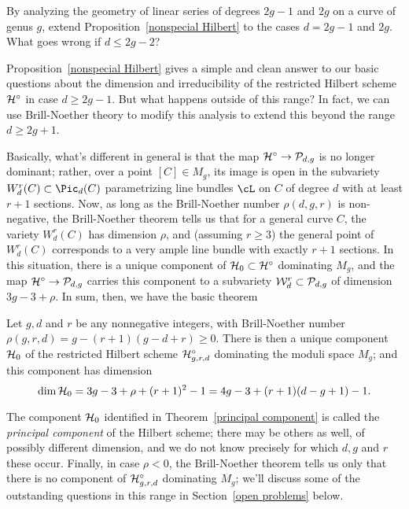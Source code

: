 \begin{exercise}
By analyzing the geometry of linear series of degrees $2g-1$ and $2g$ on a curve of genus $g$, extend Proposition~\ref{nonspecial Hilbert} to the cases $d = 2g-1$ and $2g$. What goes wrong if $d \leq 2g-2$?
\end{exercise}

Proposition~\ref{nonspecial Hilbert} gives a simple and clean answer to our basic questions about the dimension and irreducibility of the restricted Hilbert scheme $\cH^\circ$ in case $d \geq 2g-1$. But what happens outside of this range? In fact, we  can use Brill-Noether theory to modify this analysis to extend this beyond the range $d \geq 2g+1$.

Basically, what's different in general is that the map $\cH^\circ \to \cP_{d,g}$ is no longer dominant; rather, over a point $[C] \in M_g$, its image is open in the subvariety $W^r_d(C) \subset \Pic_d(C)$ parametrizing line bundles $\cL$ on $C$ of degree $d$ with at least $r+1$ sections. Now, as long as the Brill-Noether number $\rho(d,g,r)$ is non-negative, the Brill-Noether theorem tells us that for a general curve $C$, the variety $W^r_d(C)$ has dimension $\rho$, and (assuming $r \geq 3$) the general point of $W^r_d(C)$ corresponds to a very ample line bundle with exactly $r+1$ sections. In this situation, there is a unique component of $\cH_0 \subset \cH^\circ$ dominating $M_g$, and the map $\cH^\circ \to \cP_{d,g}$ carries this component to a subvariety $\cW^r_d \subset \cP_{d,g}$ of dimension $3g-3 + \rho$. In sum, then, we have the basic theorem

\begin{theorem}\label{principal component}
Let $g, d$ and $r$ be any nonnegative integers, with Brill-Noether number  $\rho(g,r,d) = g - (r+1)(g-d+r) \geq 0$. There is then a unique component $\cH_0$ of the restricted Hilbert scheme $\cH^\circ_{g,r,d}$ dominating the moduli space $M_g$; and this component has dimension
$$
\dim \cH_0 = 3g-3+\rho + (r+1)^2 - 1 = 4g-3 + (r+1)(d-g+1) - 1.
$$
\end{theorem}

 The component $\cH_0$ identified in Theorem~\ref{principal component} is called the \emph{principal component} of the Hilbert scheme; there may be others as well, of possibly different dimension, and we do not know precisely for which $d,g$ and $r$ these occur. Finally, in case $\rho < 0$, the Brill-Noether theorem tells us only that there is no component of $\cH^\circ_{g,r,d}$ dominating $M_g$; we'll discuss some of the outstanding questions in this range in Section~\ref{open problems} below. 

